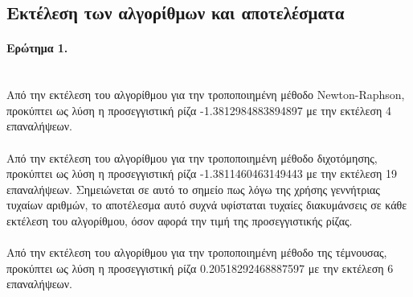 \documentclass[a4paper,11pt]{article}
\newcommand{\lt}{\latintext}
\begin{document}
\subsection*{Εκτέλεση των αλγορίθμων και αποτελέσματα}
\paragraph{Ερώτημα 1.}\mbox{}\\
Από την εκτέλεση του αλγορίθμου για την τροποποιημένη μέθοδο {\lt Newton-Raphson}, προκύπτει ως λύση η προσεγγιστική ρίζα -1.3812984883894897 με την εκτέλεση 4 επαναλήψεων.\\
\\Από την εκτέλεση του αλγορίθμου για την τροποποιημένη μέθοδο διχοτόμησης, προκύπτει ως λύση η προσεγγιστική ρίζα -1.3811460463149443 με την εκτέλεση 19 επαναλήψεων. Σημειώνεται σε αυτό το σημείο πως λόγω της χρήσης γεννήτριας τυχαίων αριθμών, το αποτέλεσμα αυτό συχνά υφίσταται τυχαίες διακυμάνσεις σε κάθε εκτέλεση του αλγορίθμου, όσον αφορά την τιμή της προσεγγιστικής ρίζας.\\
\\Από την εκτέλεση του αλγορίθμου για την τροποποιημένη μέθοδο της τέμνουσας, προκύπτει ως λύση η προσεγγιστική ρίζα 0.20518292468887597 με την εκτέλεση 6 επαναλήψεων.
\end{document}
